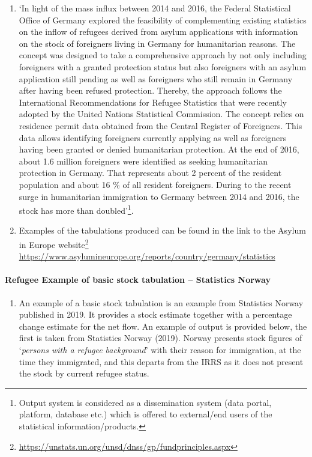 \documentclass[
]{article}
\providecommand{\tightlist}{%
  \setlength{\itemsep}{0pt}\setlength{\parskip}{0pt}}
\begin{document}
\begin{enumerate}
\def\labelenumi{\arabic{enumi}.}
\setcounter{enumi}{409}
\item
  `In light of the mass influx between 2014 and 2016, the Federal
  Statistical Office of Germany explored the feasibility of
  complementing existing statistics on the inflow of refugees derived
  from asylum applications with information on the stock of foreigners
  living in Germany for humanitarian reasons. The concept was designed
  to take a comprehensive approach by not only including foreigners
  with a granted protection status but also foreigners with an asylum
  application still pending as well as foreigners who still remain in
  Germany after having been refused protection. Thereby, the approach
  follows the International Recommendations for Refugee Statistics
  that were recently adopted by the United Nations Statistical
  Commission. The concept relies on residence permit data obtained
  from the Central Register of Foreigners. This data allows
  identifying foreigners currently applying as well as foreigners
  having been granted or denied humanitarian protection. At the end of
  2016, about 1.6 million foreigners were identified as seeking
  humanitarian protection in Germany. That represents about 2 percent
  of the resident population and about 16 \% of all resident
  foreigners. During to the recent surge in humanitarian immigration
  to Germany between 2014 and 2016, the stock has more than
  doubled'\footnote{Output system is considered as a dissemination system (data
    portal, platform, database etc.) which is offered to external/end
    users of the statistical information/products.}.
\item
  Examples of the tabulations produced can be found in the link to
  the Asylum in Europe website\footnote{\url{https://unstats.un.org/unsd/dnss/gp/fundprinciples.aspx}}
  \url{https://www.asylumineurope.org/reports/country/germany/statistics}
\end{enumerate}

\hypertarget{refugee-example-of-basic-stock-tabulation-statistics-norway-1}{%
\paragraph{Refugee Example of basic stock tabulation -- Statistics Norway}\label{refugee-example-of-basic-stock-tabulation-statistics-norway-1}}

\begin{enumerate}
\def\labelenumi{\arabic{enumi}.}
\setcounter{enumi}{411}
\tightlist
\item
  An example of a basic stock tabulation is an example from
  Statistics Norway published in 2019. It provides a stock estimate
  together with a percentage change estimate for the net flow. An
  example of output is provided below, the first is taken from
  Statistics Norway (2019). Norway presents stock figures of `\emph{persons
  with a refugee background}' with their reason for immigration, at
  the time they immigrated, and this departs from the IRRS as it does
  not present the stock by current refugee status.
\end{enumerate}
\end{document}
